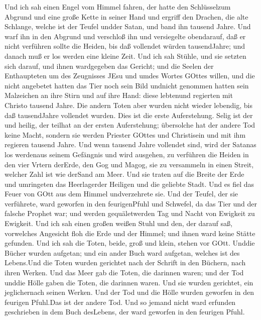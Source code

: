  Und ich sah einen Engel vom Himmel fahren, der hatte den
Schlüsselzum Abgrund und eine große Kette in seiner Hand 
und ergriff den Drachen, die alte Schlange, welche ist der Teufel undder
Satan, und band ihn tausend Jahre.  Und warf ihn in den
Abgrund und verschloß ihn und versiegelte obendarauf, daß er nicht
verführen sollte die Heiden, bis daß vollendet würden tausendJahre; und
danach muß er los werden eine kleine Zeit.  Und ich sah
Stühle, und sie setzten sich darauf, und ihnen wardgegeben das Gericht;
und die Seelen der Enthaupteten um des Zeugnisses JEsu und umdes Wortes
GOttes willen, und die nicht angebetet hatten das Tier noch sein Bild
undnicht genommen hatten sein Malzeichen an ihre Stirn und auf ihre
Hand: diese lebtenund regierten mit Christo tausend Jahre. 
Die andern Toten aber wurden nicht wieder lebendig, bis daß tausendJahre
vollendet wurden. Dies ist die erste Auferstehung.  Selig
ist der und heilig, der teilhat an der ersten Auferstehung; übersolche
hat der andere Tod keine Macht, sondern sie werden Priester GOttes und
Christisein und mit ihm regieren tausend Jahre.  Und wenn
tausend Jahre vollendet sind, wird der Satanas los werdenaus seinem
Gefängnis  und wird ausgehen, zu verführen die Heiden in den
vier Vrtern derErde, den Gog und Magog, sie zu versammeln in einen
Streit, welcher Zahl ist wie derSand am Meer.  Und sie
traten auf die Breite der Erde und umringeten das Heerlagerder Heiligen
und die geliebte Stadt. Und es fiel das Feuer von GOtt aus dem Himmel
undverzehrete sie.  Und der Teufel, der sie verführete,
ward geworfen in den feurigenPfuhl und Schwefel, da das Tier und der
falsche Prophet war; und werden gequäletwerden Tag und Nacht von
Ewigkeit zu Ewigkeit.  Und ich sah einen großen weißen
Stuhl und den, der darauf saß, vorwelches Angesicht floh die Erde und
der Himmel; und ihnen ward keine Stätte gefunden.  Und ich
sah die Toten, beide, groß und klein, stehen vor GOtt. Unddie Bücher
wurden aufgetan; und ein ander Buch ward aufgetan, welches ist des
Lebens.Und die Toten wurden gerichtet nach der Schrift in den Büchern,
nach ihren Werken.  Und das Meer gab die Toten, die
darinnen waren; und der Tod unddie Hölle gaben die Toten, die darinnen
waren. Und sie wurden gerichtet, ein jeglichernach seinen Werken.
 Und der Tod und die Hölle wurden geworfen in den feurigen
Pfuhl.Das ist der andere Tod.  Und so jemand nicht ward
erfunden geschrieben in dem Buch desLebens, der ward geworfen in den
feurigen Pfuhl.


